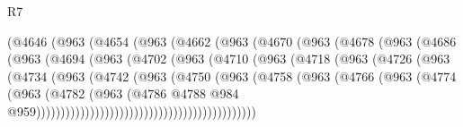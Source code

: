 \begin{lexlean}{R7}
\begin{coremodule}
                    (@4646
                      (@963
                        (@4654
                          (@963
                            (@4662
                              (@963
                                (@4670
                                  (@963
                                    (@4678
                                      (@963
                                        (@4686
                                          (@963
                                            (@4694
                                              (@963
                                                (@4702
                                                  (@963
                                                    (@4710
                                                      (@963
                                                        (@4718
                                                          (@963
                                                            (@4726
                                                              (@963
                                                                (@4734
                                                                  (@963
                                                                    (@4742
                                                                      (@963
                                                                        (@4750
                                                                          (@963
                                                                            (@4758
                                                                              (@963
                                                                                (@4766
                                                                                  (@963
                                                                                    (@4774
                                                                                      (@963
                                                                                        (@4782
                                                                                          (@963
                                                                                            (@4786
                                                                                              @4788
                                                                                              @984
                                                                                              @959)))))))))))))))))))))))))))))))))))))))))))))

\end{coremodule}
\end{lexlean}
